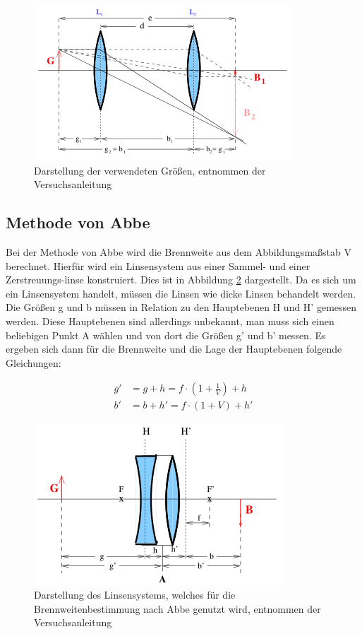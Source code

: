 \begin{figure}
  \centering
  \includegraphics[scale=0.7]{images/Bessel.png}
  \caption{Darstellung der verwendeten Größen, entnommen der Versuchsanleitung \cite[4]{sample}}
  \label{fig:Bessel}
\end{figure}

\subsection{Methode von Abbe}

Bei der Methode von Abbe wird die Brennweite aus dem Abbildungsmaßstab V berechnet.
Hierfür wird ein Linsensystem aus einer Sammel- und einer Zerstreuungs-linse konstruiert.
Dies ist in Abbildung \ref{fig:Abbe} dargestellt.
Da es sich um ein Linsensystem handelt, müssen die Linsen wie dicke Linsen behandelt werden.
Die Größen g und b müssen in Relation zu den Hauptebenen H und H' gemessen werden.
Diese Hauptebenen sind allerdings unbekannt, man muss sich einen beliebigen Punkt A wählen und von dort die Größen g' und b' messen.
Es ergeben sich dann für die Brennweite und die Lage der Hauptebenen folgende Gleichungen:

\begin{align}
  g' &= g + h  = f \cdot \left(1 + \frac{1}{V} \right) + h  \label{eqn:Abbe1}\\
  b' &= b + h' = f \cdot (1 + V) + h'   \label{eqn:Abbe2}
\end{align}

\begin{figure}
  \centering
  \includegraphics[scale=0.7]{images/Abbe.png}
  \caption{Darstellung des Linsensystems, welches für die Brennweitenbestimmung nach Abbe genutzt wird, entnommen der Versuchsanleitung \cite[5]{sample}}
  \label{fig:Abbe}
\end{figure}
